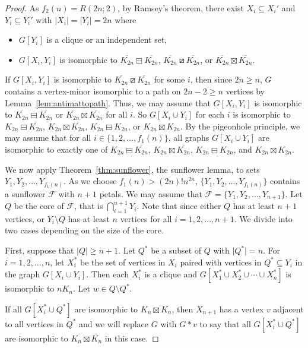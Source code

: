 \documentclass[11pt]{article}
\newcommand\abs[1]{\lvert #1\rvert}
\newcommand\mat{\boxminus}
\newcommand\tri{\boxslash}
\newcommand\antimat{\boxtimes}
\def\K_#1{{K_{#1}}}
\def\S_#1{\overline{K_{#1}}}
\begin{document}
\begin{proof}
    As $f_2(n)=R(2n;2)$, by Ramsey's theorem, there exist $X_i\subseteq X_i'$ and $Y_i\subseteq Y_i'$ with $\abs{X_i}=\abs{Y_i}=2n$ 
	where
	\begin{itemize}
	\item $G[Y_i]$ is a clique or an independent set, 
        \item $G[X_i, Y_i]$ is isomorphic to $\S_{2n}\mat\S_{2n}$, $\S_{2n}\tri \S_{2n}$, or
     $\S_{2n}\antimat\S_{2n}$.
	\end{itemize}
	If $G[X_i, Y_i]$ is isomorphic to $\S_{2n}\tri \S_{2n}$ for some $i$, 
	then since $2n\ge n$, $G$ contains a vertex-minor isomorphic to a path on $2n-2\ge n$ vertices by Lemma~\ref{lem:antimattopath}.
	Thus, we may assume that 
	$G[X_i, Y_i]$ is isomorphic to $\S_{2n}\mat\S_{2n}$ or
        $\S_{2n}\antimat\S_{2n}$ for all $i$.
        So $G[X_i\cup Y_i]$ for each $i$ is isomorphic to
        $\K_{2n}\mat\S_{2n}$,
        $\K_{2n}\antimat\S_{2n}$,
        $\K_{2n}\mat\K_{2n}$, or
        $\K_{2n}\antimat\K_{2n}$.
        By the pigeonhole principle, we may assume that
        for all $i\in\{1,2,\ldots,f_1(n)\}$,
        all graphs $G[X_i\cup Y_i]$ are isomorphic to
        exactly one of 
        $\K_{2n}\mat\S_{2n}$,
        $\K_{2n}\antimat\S_{2n}$,
        $\K_{2n}\mat\K_{2n}$, and
        $\K_{2n}\antimat\K_{2n}$.

        
     	We now apply Theorem~\ref{thm:sunflower}, the sunflower lemma, 
        to sets  $Y_1, Y_2, \ldots, Y_{f_1(n)}$.
        As we choose $f_1(n)> (2n)! n^{2n}$, 
        $\{Y_1, Y_2, \ldots, Y_{f_1(n)}\}$ contains a sunflower $\mathcal{F}$ with $n+1$ petals.
        We may assume that $\mathcal F=\{Y_1,Y_2,\ldots,Y_{n+1}\}$.
        Let $Q$ be the core of $\mathcal{F}$, that is $\bigcap_{i=1}^{n+1} Y_i$.
        Note that since 
        either $Q$ has at least $n+1$ vertices, 
        or $Y_i\setminus Q$ has at least $n$ vertices for all $i=1,2,\ldots,n+1$.
        We divide into two cases depending on the size of the core.
        
        First, suppose that $\abs{Q}\ge n+1$.
        Let $Q^*$ be a subset of $Q$ with $\abs{Q^*}=n$.
        For $i=1,2,\ldots,n$, let $X_i^*$ be the set of vertices in $X_i$
        paired with vertices in $Q^*\subseteq Y_i$ in the graph $G[X_i\cup Y_i]$.
        Then each $X_i^*$ is a clique and $G[X_1^*\cup X_2^*\cup\cdots\cup
        X_n^*]$ is isomorphic to $nK_n$.
        Let $w\in Q\setminus Q^*$.

        If all $G[X_i^*\cup Q^*]$ are isomorphic to $K_n\antimat K_n$,
        then
        $X_{n+1}$ has a vertex $v$ adjacent to all vertices in $Q^*$
        and
        we will replace $G$ with $G*v$
        to say that all $G[X_i^*\cup Q^*]$ are isomorphic to $K_n\antimat \S_n$ in this case.


\end{proof}
\end{document}
